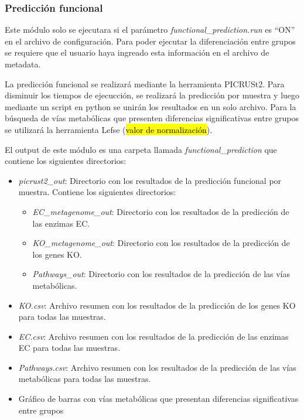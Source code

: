 \subsubsection{Predicción funcional}
Este módulo solo se ejecutara si el parámetro \textit{functional\_prediction.run} es ``ON'' en el archivo de configuración. 
Para poder ejecutar la diferenciación entre grupos se requiere que el usuario haya ingreado esta información en el archivo de metadata.

La predicción funcional se realizará mediante la herramienta PICRUSt2. 
Para disminuir los tiempos de ejecucción, se realizará la predicción por muestra y luego mediante un script en python se unirán los resultados en un solo archivo.
Para la búsqueda de vías metabólicas que presenten diferencias significativas entre grupos se utilizará la herramienta Lefse (\hl{valor de normalización}).

El output de este módulo es una carpeta llamada \textit{functional\_prediction} que contiene los siguientes directorios:
\begin{itemize}
    \item \textit{picrust2\_out}: Directorio con los resultados de la predicción funcional por muestra. Contiene los siguientes directorios:
    \begin{itemize}
        \item \textit{EC\_metagenome\_out}: Directorio con los resultados de la predicción de las enzimas EC.
        \item \textit{KO\_metagenome\_out}: Directorio con los resultados de la predicción de los genes KO.
        \item \textit{Pathways\_out}: Directorio con los resultados de la predicción de las vías metabólicas.
    \end{itemize}
    \item \textit{KO.csv}: Archivo resumen con los resultados de la predicción de los genes KO para todas las muestras.
    \item \textit{EC.csv}: Archivo resumen con los resultados de la predicción de las enzimas EC para todas las muestras.
    \item \textit{Pathways.csv}: Archivo resumen con los resultados de la predicción de las vías metabólicas para todas las muestras.
    \item Gráfico de barras con vías metabólicas que presentan diferencias significativas entre grupos
    \end{itemize}


